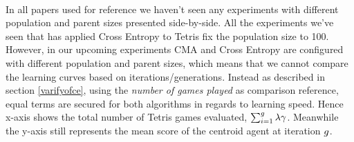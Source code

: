\\
In all papers used for reference we haven't seen any experiments with different population
and parent sizes presented side-by-side. All the experiments we've seen
that has applied Cross Entropy to Tetris fix the population size to 100. 
However, in our upcoming experiments
CMA and Cross Entropy are configured with different population and parent sizes, which means
that we cannot compare the learning curves based on iterations/generations. Instead as described
in section \ref{varifyofce}, using the  
\textit{number of games played} as comparison reference, equal terms are secured for both algorithms 
in regards to learning speed.
Hence x-axis shows the total number 
of Tetris games evaluated, 
$\sum_{i = 1}^{g} \lambda \gamma$. 
Meanwhile the y-axis still represents the mean score 
of the centroid agent at iteration $g$.\\














